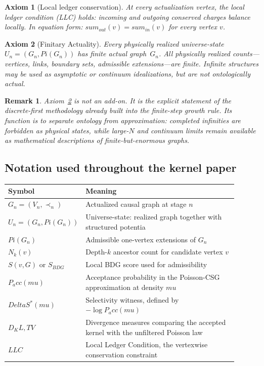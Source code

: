 \documentclass[11pt]{article}
\def\Delta{Delta}%
\def\mu{mu}%
\def\Pi{Pi}%
\def\mathrm#1{#1}%
\def\sum{sum}%
\def\Pacc{P_acc}%
\def\Dkl{D_KL}%
\def\TV{TV}%
\newtheorem{axiom}{Axiom}
\newtheorem{remark}{Remark}
\newcommand{\LLC}{\ensuremath{\mathrm{LLC}}}
\newcommand{\Pacc}{\ensuremath{P_{\mathrm{acc}}}}
\newcommand{\Pot}{\ensuremath{\Pi}}
\newcommand{\Dkl}{\ensuremath{D_{\mathrm{KL}}}}
\newcommand{\TV}{\ensuremath{\mathrm{TV}}}
\begin{document}
\begin{axiom}[Local ledger conservation]
\label{ax:llc}
At every actualization vertex, the local ledger condition (LLC) holds: incoming and outgoing conserved charges balance locally. In equation form: $\sum_{\mathrm{out}}(v)=\sum_{\mathrm{in}}(v)$ for every vertex $v$.
\end{axiom}

\begin{axiom}[Finitary Actuality]
\label{ax:finite}
Every physically realized universe-state $U_n=(G_n,\Pot(G_n))$ has finite actual graph~$G_n$. All physically realized counts---vertices, links, boundary sets, admissible extensions---are finite. Infinite structures may be used as asymptotic or continuum idealizations, but are not ontologically actual.
\end{axiom}

\begin{remark}
Axiom~\ref{ax:finite} is not an add-on. It is the explicit statement of the discrete-first methodology already built into the finite-step growth rule. Its function is to separate ontology from approximation: completed infinities are forbidden as physical states, while large-$N$ and continuum limits remain available as mathematical descriptions of finite-but-enormous graphs.
\end{remark}


\subsection*{Notation used throughout the kernel paper}

\begin{center}
\begin{tabular}{>{\raggedright\arraybackslash}p{0.22\linewidth} >{\raggedright\arraybackslash}p{0.68\linewidth}}
\toprule
Symbol & Meaning \\
\midrule
$G_n=(V_n,\prec_n)$ & Actualized causal graph at stage $n$ \\
$U_n=(G_n,\Pot(G_n))$ & Universe-state: realized graph together with structured potentia \\
$\Pot(G_n)$ & Admissible one-vertex extensions of $G_n$ \\
$N_k(v)$ & Depth-$k$ ancestor count for candidate vertex $v$ \\
$S(v,G)$ or $S_{\mathrm{BDG}}$ & Local BDG score used for admissibility \\
$\Pacc(\mu)$ & Acceptance probability in the Poisson-CSG approximation at density $\mu$ \\
$\Delta S^*(\mu)$ & Selectivity witness, defined by $-\log \Pacc(\mu)$ \\
$\Dkl,\TV$ & Divergence measures comparing the accepted kernel with the unfiltered Poisson law \\
\LLC & Local Ledger Condition, the vertexwise conservation constraint \\
\bottomrule
\end{tabular}
\end{center}
\end{document}
